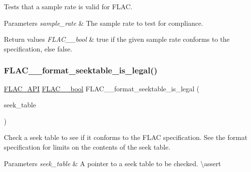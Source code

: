 Tests that a sample rate is valid for F\+L\+AC.


\begin{DoxyParams}{Parameters}
{\em sample\+\_\+rate} & The sample rate to test for compliance. \\
\hline
\end{DoxyParams}

\begin{DoxyRetVals}{Return values}
{\em F\+L\+A\+C\+\_\+\+\_\+bool} & {\ttfamily true} if the given sample rate conforms to the specification, else {\ttfamily false}. \\
\hline
\end{DoxyRetVals}
\mbox{\label{group__flac__format_ga02270d9b92dbe7617635c65a1d0f58ff}} 
\subsubsection{\texorpdfstring{FLAC\_\_format\_seektable\_is\_legal()}{FLAC\_\_format\_seektable\_is\_legal()}}
{\footnotesize\ttfamily \mbox{\hyperlink{group__flac__export_ga56ca07df8a23310707732b1c0007d6f5}{F\+L\+A\+C\+\_\+\+A\+PI}} \mbox{\hyperlink{ordinals_8h_a95103469f1cbd78b8cf250194985b34e}{F\+L\+A\+C\+\_\+\+\_\+bool}} F\+L\+A\+C\+\_\+\+\_\+format\+\_\+seektable\+\_\+is\+\_\+legal (\begin{DoxyParamCaption}\item[{const \mbox{\hyperlink{struct_f_l_a_c_____stream_metadata___seek_table}{F\+L\+A\+C\+\_\+\+\_\+\+Stream\+Metadata\+\_\+\+Seek\+Table}} $\ast$}]{seek\+\_\+table }\end{DoxyParamCaption})}

Check a seek table to see if it conforms to the F\+L\+AC specification. See the format specification for limits on the contents of the seek table.


\begin{DoxyParams}{Parameters}
{\em seek\+\_\+table} & A pointer to a seek table to be checked. \textbackslash{}assert 
\begin{DoxyCode}{1}
\end{DoxyCode}
 \\
\hline
\end{DoxyParams}

